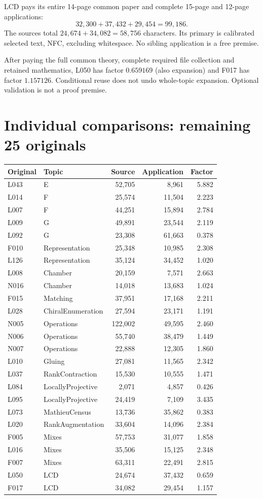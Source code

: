 \documentclass[11pt,a4paper]{article}
\begin{document}
LCD pays its entire 14-page common paper and complete 15-page and 12-page applications: \[32,300+37,432+29,454=99,186.\] The sources total $24,674+34,082=58,756$ characters. Its primary is calibrated selected text, NFC, excluding whitespace. No sibling application is a free premise.

After paying the full common theory, complete required file collection and retained mathematics, L050 has factor $0.659169$ (also expansion) and F017 has factor $1.157126$. Conditional reuse does not undo whole-topic expansion. Optional validation is not a proof premise.
\newpage
\section*{Individual comparisons: remaining 25 originals}
\begin{center}\small\begin{tabular}{llrrr}\toprule
Original & Topic & Source & Application & Factor\\\midrule
L043 & E & 52,705 & 8,961 & 5.882 \\
L014 & F & 25,574 & 11,504 & 2.223 \\
L007 & F & 44,251 & 15,894 & 2.784 \\
L009 & G & 49,891 & 23,544 & 2.119 \\
L092 & G & 23,308 & 61,663 & 0.378 \\
F010 & Representation & 25,348 & 10,985 & 2.308 \\
L126 & Representation & 35,124 & 34,452 & 1.020 \\
L008 & Chamber & 20,159 & 7,571 & 2.663 \\
N016 & Chamber & 14,018 & 13,683 & 1.024 \\
F015 & Matching & 37,951 & 17,168 & 2.211 \\
L028 & ChiralEnumeration & 27,594 & 23,171 & 1.191 \\
N005 & Operations & 122,002 & 49,595 & 2.460 \\
N006 & Operations & 55,740 & 38,479 & 1.449 \\
N007 & Operations & 22,888 & 12,305 & 1.860 \\
L010 & Gluing & 27,081 & 11,565 & 2.342 \\
L037 & RankContraction & 15,530 & 10,555 & 1.471 \\
L084 & LocallyProjective & 2,071 & 4,857 & 0.426 \\
L095 & LocallyProjective & 24,419 & 7,109 & 3.435 \\
L073 & MathieuCensus & 13,736 & 35,862 & 0.383 \\
L020 & RankAugmentation & 33,604 & 14,096 & 2.384 \\
F005 & Mixes & 57,753 & 31,077 & 1.858 \\
L016 & Mixes & 35,506 & 15,125 & 2.348 \\
F007 & Mixes & 63,311 & 22,491 & 2.815 \\
L050 & LCD & 24,674 & 37,432 & 0.659 \\
F017 & LCD & 34,082 & 29,454 & 1.157 \\\bottomrule\end{tabular}\end{center}
\end{document}

